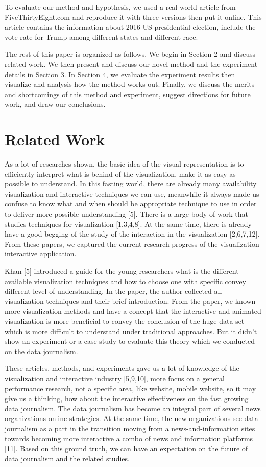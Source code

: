 \documentclass[9pt,journal,compsoc]{IEEEtran}
\begin{document}
To evaluate our method and hypothesis, we used a real world article from FiveThirtyEight.com and reproduce it with three versions then put it online. This article contains the information about 2016 US presidential election, include the vote rate for Trump among different states and different race.

The rest of this paper is organized as follows. We begin in Section 2 and discuss related work. We then present and discuss our novel method and the experiment details in Section 3. In Section 4, we evaluate the experiment results then visualize and analysis how the method works out. Finally, we discuss the merits and shortcomings of this method and experiment, suggest directions for future work, and draw our conclusions.

\section{Related Work}
\large
As a lot of researches shown, the basic idea of the visual representation is to efficiently interpret what is behind of the visualization, make it as easy as possible to understand. In this fasting world, there are already many availability visualization and interactive techniques we can use, meanwhile it always made us confuse to know what and when should be appropriate technique to use in order to deliver more possible understanding [5]. There is a large body of work that studies techniques for visualization [1,3,4,8]. At the same time, there is already have a good begging of the study of the interaction in the visualization [2,6,7,12]. From these papers, we captured the current research progress of the visualization interactive application.

Khan [5] introduced a guide for the young researchers what is the different available visualization techniques and how to choose one with specific convey different level of understanding. In the paper, the author collected all visualization techniques and their brief introduction. From the paper, we known more visualization methods and have a concept that the interactive and animated visualization is more beneficial to convey the conclusion of the huge data set which is more difficult to understand under traditional approaches. But it didn't show an experiment or a case study to evaluate this theory which we conducted on the data journalism.
  
These articles, methods, and experiments gave us a lot of knowledge of the visualization and interactive industry [5,9,10],  more focus on a general performance research, not a specific area, like website, mobile website, so it may give us a thinking, how about the interactive effectiveness on the fast growing data journalism. The data journalism has become an integral part of several news organizations online strategies. At the same time, the new organizations see data journalism as a part in the transition moving from a news-and-information sites towards becoming more interactive a combo of news and information platforms [11]. Based on this ground truth, we can have an expectation on the future of data journalism and the related studies.   
\end{document}
